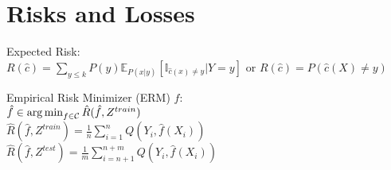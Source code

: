 \section*{Risks and Losses}
Expected Risk:\\ $R(\hat c) = \sum_{y \leq  k}P(y)\mathbb{E}_{P(x|y)}[\mathbb{I}_{{\hat c(x) \neq y}}| Y = y]$ or 
$R(\hat c) = P(\hat c (X) \neq y)$

Empirical Risk Minimizer (ERM) $\hat{f}$:\\
$\hat{f} \in \operatorname*{arg\,min}_{f \in \mathcal{C}} \hat{R}(\hat{f}, Z^{train})$\\
$\hat{R}(\hat{f}, Z^{train}) = \frac{1}{n} \sum_{i=1}^n Q(Y_i, \hat{f}(X_i))$\\
$\hat{R}(\hat{f}, Z^{test}) = \frac{1}{m} \sum_{i=n+1}^{n+m} Q(Y_i, \hat{f}(X_i))$